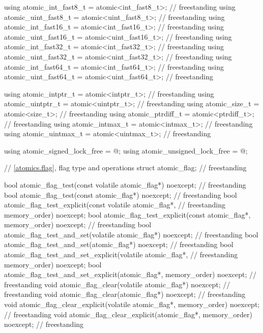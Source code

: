 \begin{codeblock}
{  using atomic_int_fast8_t    = atomic<int_fast8_t>;                                // freestanding
  using atomic_uint_fast8_t   = atomic<uint_fast8_t>;                               // freestanding
  using atomic_int_fast16_t   = atomic<int_fast16_t>;                               // freestanding
  using atomic_uint_fast16_t  = atomic<uint_fast16_t>;                              // freestanding
  using atomic_int_fast32_t   = atomic<int_fast32_t>;                               // freestanding
  using atomic_uint_fast32_t  = atomic<uint_fast32_t>;                              // freestanding
  using atomic_int_fast64_t   = atomic<int_fast64_t>;                               // freestanding
  using atomic_uint_fast64_t  = atomic<uint_fast64_t>;                              // freestanding

  using atomic_intptr_t       = atomic<intptr_t>;                                   // freestanding
  using atomic_uintptr_t      = atomic<uintptr_t>;                                  // freestanding
  using atomic_size_t         = atomic<size_t>;                                     // freestanding
  using atomic_ptrdiff_t      = atomic<ptrdiff_t>;                                  // freestanding
  using atomic_intmax_t       = atomic<intmax_t>;                                   // freestanding
  using atomic_uintmax_t      = atomic<uintmax_t>;                                  // freestanding

  using atomic_signed_lock_free   = @\seebelow@;
  using atomic_unsigned_lock_free = @\seebelow@;

  // \ref{atomics.flag}, flag type and operations
  struct atomic_flag;                                                               // freestanding

  bool atomic_flag_test(const volatile atomic_flag*) noexcept;                      // freestanding
  bool atomic_flag_test(const atomic_flag*) noexcept;                               // freestanding
  bool atomic_flag_test_explicit(const volatile atomic_flag*,                       // freestanding
                                 memory_order) noexcept;
  bool atomic_flag_test_explicit(const atomic_flag*, memory_order) noexcept;        // freestanding
  bool atomic_flag_test_and_set(volatile atomic_flag*) noexcept;                    // freestanding
  bool atomic_flag_test_and_set(atomic_flag*) noexcept;                             // freestanding
  bool atomic_flag_test_and_set_explicit(volatile atomic_flag*,                     // freestanding
                                         memory_order) noexcept;
  bool atomic_flag_test_and_set_explicit(atomic_flag*, memory_order) noexcept;      // freestanding
  void atomic_flag_clear(volatile atomic_flag*) noexcept;                           // freestanding
  void atomic_flag_clear(atomic_flag*) noexcept;                                    // freestanding
  void atomic_flag_clear_explicit(volatile atomic_flag*, memory_order) noexcept;    // freestanding
  void atomic_flag_clear_explicit(atomic_flag*, memory_order) noexcept;             // freestanding

}
\end{codeblock}
